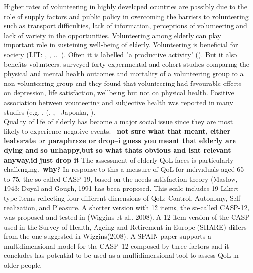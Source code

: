 \documentclass[10pt, letterpaper]{article}
\begin{document}
\begin{spacing}{1.4}
Higher rates of volunteering in  highly developed countries are possibly due to the role of supply factors and public policy in overcoming the barriers to volunteering such as transport difficulties, lack of information, perceptions of volunteering and lack of variety in the opportunities. Volunteering among elderly can play important role in susteining well-being of elderly. Volunteering is beneficial for society (LIT: \citet{Oecd15}, \cite{prouteau06}, ... ). Often it is labelled "a productive activity" (\citet{hank09}). But it also benefits volunteers. \citet{jenkinson2013volunteering} surveyed forty experimental and cohort studies comparing the physical and mental health outcomes and mortality of a volunteering group to a non-volunteering group and they found that volunteering had favourable effects on depression, life satisfaction, wellbeing but not on physical health. Positive association between vounteering and subjective health was reported in many studies (e.g. \citet{borgonovi08}, (\cite{anderson14}, \cite{li06}, \cite{VanWilligen00}, Japonka,  \citet{detollenaere17}). \\

Quality of life  of elderly has become a major social issue since they are most
likely to experience negative events. \textbf{--not sure what that meant, either
leaborate or paraphraze or drop--i guess you meant that elderly are dying and so unhappy,but so what thats obvious and isnt relevant anyway,id just drop it}
The assessment of elderly QoL faces is particularly challenging.\textbf{--why?} In response to this a measure of QoL for individuals aged 65 to 75, the so-called CASP-19, based on the needs-satisfaction theory (Maslow, 1943; Doyal and Gough, 1991 has been proposed. This scale includes 19 Likert-type items reflecting four different dimensions of QoL: Control, Autonomy, Self-realization, and Pleasure. A shorter version with 12 items, the so-called CASP-12, was proposed and tested in (Wiggins et al., 2008). A 12-item version of the CASP used in the Survey of Health, Ageing and Retirement in Europe (SHARE) differs from the one suggested in Wiggins(2008). A SPAIN paper supports a multidimensional model for the CASP–12 composed by three factors and it concludes has potential to be used as a multidimensional tool to assess QoL in older people. \\


\end{spacing}
\end{document}
